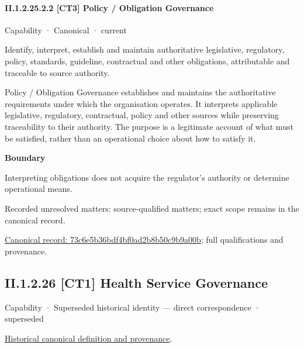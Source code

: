 \paragraph*{II.1.2.25.2.2 [CT3] Policy / Obligation Governance}
\label{navigation:II.1.2.25.2.2}

\label{element:73c6e5b36bdf4bf0ad2b8b50c9b9a00b}
{\small Capability · Canonical · current}\par

Identify, interpret, establish and maintain authoritative legislative, regulatory, policy, standards, guideline, contractual and other obligations, attributable and traceable to source authority.



Policy / Obligation Governance establishes and maintains the authoritative requirements under which the organisation operates. It interprets applicable legislative, regulatory, contractual, policy and other sources while preserving traceability to their authority. The purpose is a legitimate account of what must be satisfied, rather than an operational choice about how to satisfy it.



\textbf{Boundary}



Interpreting obligations does not acquire the regulator's authority or determine operational means.


{\small Recorded unresolved matters: source-qualified matters; exact scope remains in the canonical record.}\par
{\footnotesize \href{../../../../continuum/strategy/capability/73c6e5b36bdf4bf0ad2b8b50c9b9a00b.md}{Canonical record: 73c6e5b36bdf4bf0ad2b8b50c9b9a00b}; full qualifications and provenance.}\par
\subsection*{II.1.2.26 [CT1] Health Service Governance}
\label{navigation:II.1.2.26}

\label{element:24f3dd30223142efa35a5826552d53ab}
{\small Capability · Superseded historical identity — direct correspondence · superseded}\par
\href{../../../../continuum/strategy/capability/24f3dd30223142efa35a5826552d53ab.md}{Historical canonical definition and provenance}.\par

